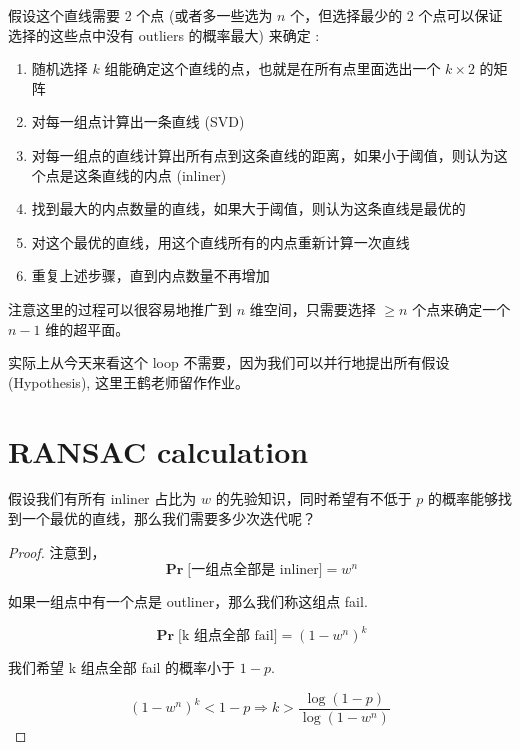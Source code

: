 \begin{definition}
    假设这个直线需要 2 个点 (或者多一些选为 $n$ 个，但选择最少的 2 个点可以保证选择的这些点中没有 outliers 的概率最大) 来确定 : 

    \begin{enumerate}
        \item 随机选择 $k$ 组能确定这个直线的点，也就是在所有点里面选出一个 $k\times 2$ 的矩阵
        \item 对每一组点计算出一条直线 (SVD)
        \item 对每一组点的直线计算出所有点到这条直线的距离，如果小于阈值，则认为这个点是这条直线的内点 (inliner)
        \item 找到最大的内点数量的直线，如果大于阈值，则认为这条直线是最优的
        \item 对这个最优的直线，用这个直线所有的内点重新计算一次直线
        \item 重复上述步骤，直到内点数量不再增加
    \end{enumerate}
    
    注意这里的过程可以很容易地推广到 $n$ 维空间，只需要选择 $\geq n$ 个点来确定一个 $n-1$ 维的超平面。
\end{definition}
\begin{note}
    实际上从今天来看这个 loop 不需要，因为我们可以并行地提出所有假设 (Hypothesis), 这里王鹤老师留作作业。
\end{note}

\section{RANSAC calculation}
\begin{problem}
假设我们有所有 inliner 占比为 $w$ 的先验知识，同时希望有不低于 $p$ 的概率能够找到一个最优的直线，那么我们需要多少次迭代呢？
\end{problem}
\begin{proof}
注意到，
\begin{equation}
\mathbf{\Pr}\text{[一组点全部是 inliner]} = w^n
\end{equation}

如果一组点中有一个点是 outliner，那么我们称这组点 fail.

\begin{equation}
\mathbf{\Pr}\text{[k 组点全部 fail]} = {(1-w^n)}^k
\end{equation}

我们希望 k 组点全部 fail 的概率小于 $1-p$.

\begin{equation}
{(1-w^{n})}^k < 1-p
\Rightarrow
k > \frac{\log(1-p)}{\log(1-w^n)}
\end{equation}
\end{proof}

